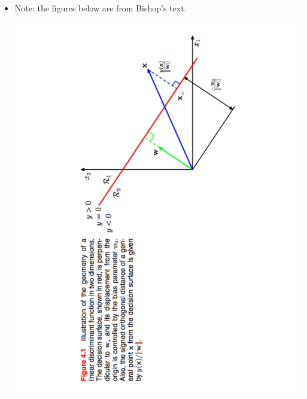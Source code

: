 \documentclass[12pt,letterpaper]{article}
\begin{document}
\begin{itemize}
\item Note: the figures below are from Bishop's text. 

\begin{center}\includegraphics[width=5in, angle=270]{fig41.pdf}\end{center}


\end{itemize}
\end{document}
